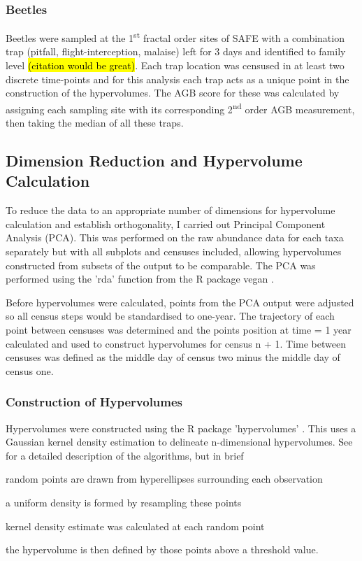 	
	\subsubsection*{Beetles}
	
	Beetles were sampled at the 1\textsuperscript{st} fractal order sites of SAFE with a combination trap (pitfall, flight-interception, malaise) left for 3 days and identified to family level \hl{(citation would be great)}. Each trap location was censused in at least two discrete time-points and for this analysis each trap acts as a unique point in the construction of the hypervolumes. The AGB score for these was calculated by assigning each sampling site with its corresponding 2\textsuperscript{nd} order AGB measurement, then taking the median of all these traps.
		
\subsection{Dimension Reduction and Hypervolume Calculation}
	
	
    To reduce the data to an appropriate number of dimensions for hypervolume calculation and establish orthogonality, I carried out Principal Component Analysis (PCA). This was performed on the raw abundance data for each taxa separately but with all subplots and censuses included, allowing hypervolumes constructed from subsets of the output to be comparable. The PCA was performed using the 'rda' function from the R package vegan \citep{Oksanen2018}.	
	
	Before hypervolumes were calculated, points from the PCA output were adjusted so all census steps would be standardised to one-year. The trajectory of each point between censuses was determined and the points position at time = 1 year calculated and used to construct hypervolumes for census n + 1. Time between censuses was defined as the middle day of census two minus the middle day of census one.
	
	\subsubsection*{Construction of Hypervolumes}
	Hypervolumes were constructed using the R package 'hypervolumes' \citep{Blonder2017a}. This uses a Gaussian kernel density estimation to delineate n-dimensional hypervolumes. See \cite{Blonder2014, Blonder2017b} for a detailed description of the algorithms, but in brief
	\begin{enumerate*}[label=(\roman*)]
		\item random points are drawn from hyperellipses surrounding each observation
		\item a uniform density is formed by resampling these points
		\item kernel density estimate was calculated at each random point
		\item the hypervolume is then defined by those points above a threshold value.
	\end{enumerate*}  
		
